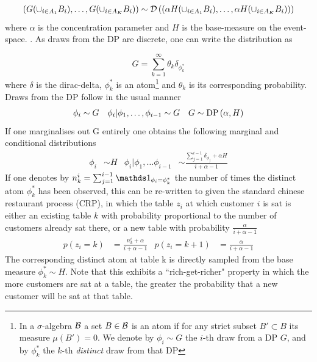 \begin{align}
\left(
    G(\cup_{i \in A_1} B_i),
    \ldots,
    G(\cup_{i \in A_K} B_i)
\right)
\sim
\mathcal{D} \left( {
    \left(
        \alpha H(\cup_{i \in A_1} B_i),
        \ldots,
        \alpha H(\cup_{i \in A_K} B_i)
    \right)
} \right)
\end{align}
where $\alpha$ is the concentration parameter and $H$ is the base-measure on the event-space. . As draws from the DP are discrete, one can write the distribution as


\begin{equation}
G = \sum_{k=1}^{\infty} \theta_k \delta_{\phi^*_k} \label{eqn:ch1:dp-as-weighted-atoms}
\end{equation}
where $\delta$ is the dirac-delta, $\phi^*_k$ is an atom\footnote{In a $\sigma$-algebra $\mathcal{B}$ a set $B \in \mathcal{B}$ is an atom if for any strict subset $B' \subset B$ its measure $\mu(B') = 0$. We denote by $\phi_i \sim G$ the $i$-th draw from a DP $G$, and by $\phi^*_k$ the $k$-th \emph{distinct} draw from that DP} and $\theta_k$ is its corresponding probability. Draws from the DP follow in the usual manner
\begin{align}
\phi_i & \sim G &
\phi_i|\phi_1,\ldots,\phi_{i-1} & \sim G &
G \sim \text{DP} \left( {\alpha, H} \right)
\end{align}
If one marginalises out G entirely one obtains the following marginal and conditional distributions
\begin{align}
\phi_i &
\sim H &
\phi_i | \phi_1, \ldots \phi_{i-1} &
\sim \frac{\sum_{j=1}^{i-1} \delta_{\phi_j} + \alpha H}{i + \alpha - 1}
\end{align}
If one denotes by $n^i_k = \sum_{j=1}^{i-1} \one_{\phi_i = \phi^*_k}$ the number of times the distinct atom $\phi^*_k$ has been observed, this can be re-written to given the standard chinese restaurant process (CRP), in which the table $z_i$ at which customer $i$ is sat is either an existing table $k$ with probability proportional to the number of customers already sat there, or a new table with probability $\frac{\alpha}{i + \alpha - 1}$
\begin{align}
p(z_i = k) & = \frac{n^i_k + \alpha}{i + \alpha - 1} &
p(z_i = k + 1) & = \frac{\alpha}{i + \alpha - 1}
\end{align}
The corresponding distinct atom at table k is directly sampled from the base measure $\phi^*_k \sim H$. Note that this exhibits a ``rich-get-richer" property in which the more customers are sat at a table, the greater the probability that a new customer will be sat at that table.

